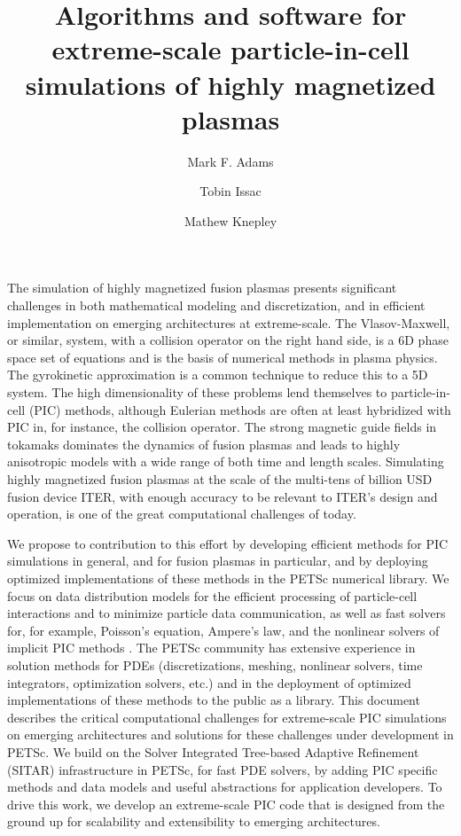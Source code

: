 \documentclass[review]{siamart}
\title{Algorithms and software for extreme-scale particle-in-cell simulations of highly magnetized plasmas}
\author{Mark F. Adams\and Tobin Issac\and Mathew Knepley}
\begin{document}
\maketitle

The simulation of highly magnetized fusion plasmas presents significant challenges in both mathematical modeling and discretization, and in efficient implementation on emerging architectures at extreme-scale.
The Vlasov-Maxwell, or similar, system, with a collision operator on the right hand side, is a 6D phase space set of equations and is the basis of numerical methods in plasma physics.
The gyrokinetic approximation is a common technique to reduce this to a 5D system.
The high dimensionality of these problems lend themselves to particle-in-cell (PIC) methods, although Eulerian methods are often at least hybridized with PIC in, for instance, the collision operator.
The strong magnetic guide fields in tokamaks dominates the dynamics of fusion plasmas and leads to highly anisotropic models with a wide range of both time and length scales.
Simulating highly magnetized fusion plasmas at the scale of the multi-tens of billion USD fusion device ITER, with enough accuracy to be relevant to ITER's design and operation, is one of the great computational challenges of today.

We propose to contribution to this effort by developing efficient methods for PIC simulations in general, and for fusion plasmas in particular, and by deploying optimized implementations of these methods in the PETSc numerical library.
We focus on data distribution models for the efficient processing of particle-cell interactions and to minimize particle data communication, as well as fast solvers for, for example, Poisson's equation, Ampere's law, and the nonlinear solvers of implicit PIC methods \cite{DBLP:journals/cphysics/ChenC15}.
The PETSc community has extensive experience in solution methods for PDEs (discretizations, meshing,  nonlinear solvers, time integrators, optimization solvers, etc.) and in the deployment of optimized implementations of these methods to the public as a library.
This document describes the critical computational challenges for extreme-scale PIC simulations on emerging architectures and solutions for these challenges under development in PETSc.
We build on the Solver Integrated Tree-based Adaptive Refinement (SITAR) infrastructure in PETSc, for fast PDE solvers, by adding PIC specific methods and data models and useful abstractions for application developers.
To drive this work, we develop an extreme-scale PIC code that is designed from the ground up for scalability and extensibility to emerging architectures.
\end{document}
